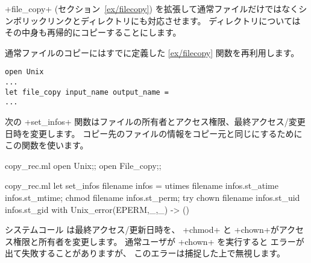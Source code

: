 \ml+file_copy+ (セクション~\ref{ex/filecopy}) を拡張して通常ファイルだけではなくシンボリックリンクとディレクトリにも対応させます。
ディレクトリについてはその中身も再帰的にコピーすることにします。

通常ファイルのコピーにはすでに定義した \ref{ex/filecopy} 関数を再利用します。
\begin{lstlisting}
open Unix
...
let file_copy input_name output_name =
...
\end{lstlisting}
次の \ml+set_infos+ 関数はファイルの所有者とアクセス権限、最終アクセス/変更日時を変更します。
コピー先のファイルの情報をコピー元と同じにするためにこの関数を使います。
%
\begin{codefile}{copy_rec.ml}
open Unix;;
open File_copy;;
\end{codefile}
%
\begin{listingcodefile}{copy_rec.ml}
let set_infos filename infos =
  utimes filename infos.st_atime infos.st_mtime;
  chmod filename infos.st_perm;
  try
    chown filename infos.st_uid infos.st_gid
  with Unix_error(EPERM,_,_) -> ()
\end{listingcodefile}
%
システムコール  は最終アクセス/更新日時を、
\ml+chmod+ と \ml+chown+がアクセス権限と所有者を変更します。
通常ユーザが \ml+chown+ を実行すると  エラーが出て失敗することがありますが、
このエラーは捕捉した上で無視します。

